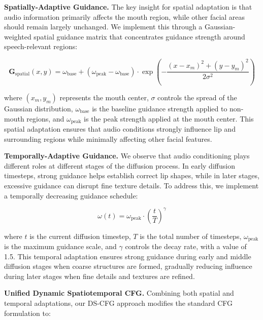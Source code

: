 \textbf{Spatially-Adaptive Guidance.}
The key insight for spatial adaptation is that audio information primarily affects the mouth region, while other facial areas should remain largely unchanged. We implement this through a Gaussian-weighted spatial guidance matrix that concentrates guidance strength around speech-relevant regions:

\vspace{-1em}
\begin{equation}
\mathbf{G}_{\text{spatial}}(x, y) = \omega_{\text{base}} + (\omega_{\text{peak}} - \omega_{\text{base}}) \cdot \exp\left(-\frac{(x - x_m)^2 + (y - y_m)^2}{2\sigma^2}\right)
\end{equation}
\vspace{-1em}

where $(x_m, y_m)$ represents the mouth center, $\sigma$ controls the spread of the Gaussian distribution, $\omega_{\text{base}}$ is the baseline guidance strength applied to non-mouth regions, and $\omega_{\text{peak}}$ is the peak strength applied at the mouth center. This spatial adaptation ensures that audio conditions strongly influence lip and surrounding regions while minimally affecting other facial features.


\textbf{Temporally-Adaptive Guidance.}
We observe that audio conditioning plays different roles at different stages of the diffusion process. In early diffusion timesteps, strong guidance helps establish correct lip shapes, while in later stages, excessive guidance can disrupt fine texture details. To address this, we implement a temporally decreasing guidance schedule:

\vspace{-1em}
\begin{equation}
\omega(t) = \omega_{\text{peak}} \cdot \left(\frac{t}{T}\right)^{\gamma}
\end{equation}
\vspace{-1em}

where $t$ is the current diffusion timestep, $T$ is the total number of timesteps, $\omega_{\text{peak}}$ is the maximum guidance scale, and $\gamma$ controls the decay rate,  with a value of 1.5.
This temporal adaptation ensures strong guidance during early and middle diffusion stages when coarse structures are formed, gradually reducing influence during later stages when fine details and textures are refined.

\textbf{Unified Dynamic Spatiotemporal CFG.}
Combining both spatial and temporal adaptations, our DS-CFG approach modifies the standard CFG formulation to:

